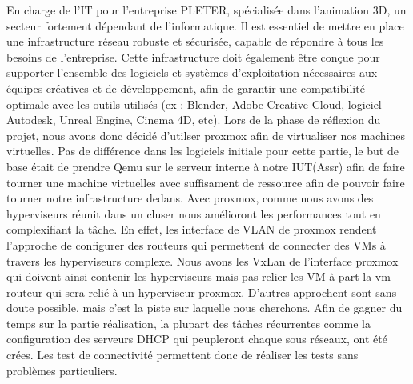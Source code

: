 \documentclass[../file.tex]{subfiles}
\begin{document}
En charge de l'IT pour l'entreprise PLETER, spécialisée dans l'animation 3D, un secteur fortement dépendant de l'informatique. Il est essentiel de mettre en place une infrastructure réseau robuste et sécurisée, capable de répondre à tous les besoins de l'entreprise. Cette infrastructure doit également être conçue pour supporter l'ensemble des logiciels et systèmes d'exploitation nécessaires aux équipes créatives et de développement, afin de garantir une compatibilité optimale avec les outils utilisés (ex : Blender, Adobe Creative Cloud, logiciel Autodesk, Unreal Engine, Cinema 4D, etc).
\newline
Lors de la phase de réflexion du projet, nous avons donc décidé d'utilser proxmox afin de virtualiser
nos machines virtuelles. Pas de différence dans les logiciels initiale pour cette partie, le but de base 
était de prendre Qemu sur le serveur interne à notre IUT(Assr) afin de faire tourner une machine virtuelles
avec suffisament de ressource afin de pouvoir faire tourner notre infrastructure dedans.
Avec proxmox, comme nous avons des hyperviseurs réunit dans un cluser nous amélioront les performances tout en 
complexifiant la tâche. En effet, les interface de VLAN de proxmox rendent l'approche de configurer des routeurs 
qui permettent de connecter des VMs à travers les hyperviseurs complexe. Nous avons les VxLan de l'interface proxmox 
qui doivent ainsi contenir les hyperviseurs mais pas relier les VM à part la vm routeur qui sera relié à un hyperviseur proxmox.
D'autres approchent sont sans doute possible, mais c'est la piste sur laquelle nous cherchons.
Afin de gagner du temps sur la partie réalisation, la plupart des tâches récurrentes comme la configuration des serveurs 
DHCP qui peupleront chaque sous réseaux, ont été crées. Les test de connectivité permettent donc de réaliser les tests sans problèmes
particuliers.
\end{document}
